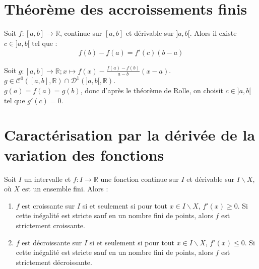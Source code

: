 \documentclass[../main.tex]{subfiles}
\begin{document}
\section{Théorème des accroissements finis}
\begin{tcolorbox}[title=Théorème 18.21, title filled=false, colframe=orange, colback=orange!10!white]
    Soit $f:[a, b]\to \mathbb{R}$, continue sur $[a, b]$ et dérivable sur $]a, b[$. Alors il existe $c\in ]a, b[$ tel que :
    \begin{align*}
        f(b) - f(a) = f'(c)(b - a)
    \end{align*}
\end{tcolorbox}

\noindent Soit $g:[a, b] \to \mathbb{R}; x \mapsto f(x) - \frac{f(a) - f(b)}{a - b}(x - a)$. \\
$g \in \mathcal{C}^0([a, b], \mathbb{R}) \cap \mathcal{D}^1(]a, b[, \mathbb{R})$. \\
$g(a) = f(a) = g(b)$, donc d'après le théorème de Rolle, on choisit $c\in ]a, b[$ tel que $g'(c) = 0$.

\section{Caractérisation par la dérivée de la variation des fonctions}
\begin{tcolorbox}[title=Théorème 18.37, title filled=false, colframe=orange, colback=orange!10!white]
    Soit $I$ un intervalle et $f:I\to \mathbb{R}$ une fonction continue sur $I$ et dérivable sur $I \backslash X$, où $X$ est un ensemble fini. Alors : 
    \begin{enumerate}
        \item $f$ est croissante sur $I$ si et seulement si pour tout $x\in I\backslash X$, $f'(x) \geq 0$. Si cette inégalité est stricte sauf en un nombre fini de points, alors $f$ est strictement croissante.
        \item $f$ est décroissante sur $I$ si et seulement si pour tout $x\in I\backslash X$, $f'(x) \leq 0$. Si cette inégalité est stricte sauf en un nombre fini de points, alors $f$ est strictement décroissante.
    \end{enumerate}
\end{tcolorbox}
\end{document}
